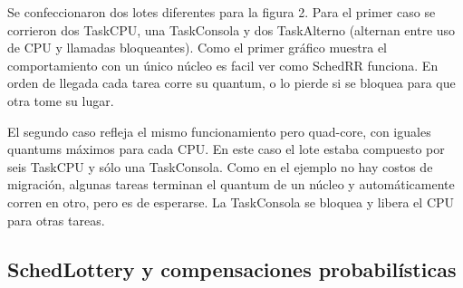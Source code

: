 Se confeccionaron dos lotes diferentes para la figura 2. Para el primer caso se corrieron dos TaskCPU, una TaskConsola y dos TaskAlterno (alternan entre uso de CPU y llamadas bloqueantes). Como el primer gráfico muestra el comportamiento con un único núcleo es facil ver como SchedRR funciona. En orden de llegada cada tarea corre su quantum, o lo pierde si se bloquea para que otra tome su lugar.

El segundo caso refleja el mismo funcionamiento pero quad-core, con iguales quantums máximos para cada CPU. En este caso el lote estaba compuesto por seis TaskCPU y sólo una TaskConsola. Como en el ejemplo no hay costos de migración, algunas tareas terminan el quantum de un núcleo y automáticamente corren en otro, pero es de esperarse. La TaskConsola se bloquea y libera el CPU para otras tareas.

\subsection{SchedLottery y compensaciones probabilísticas}


